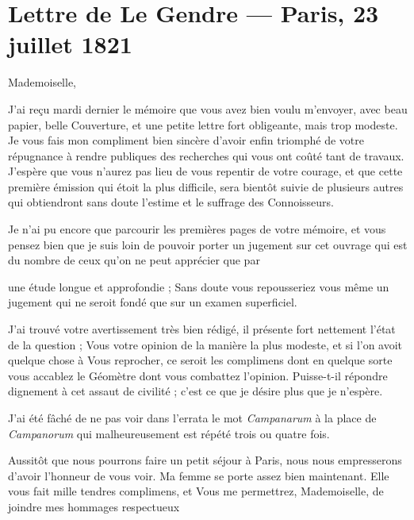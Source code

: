 \documentclass[11pt,a4paper]{article}
\begin{document}
\section{Lettre de Le Gendre — Paris, 23 juillet 1821}


Mademoiselle,

J'ai reçu mardi dernier le mémoire que vous avez bien voulu m'envoyer, avec
beau papier, belle Couverture, et une petite lettre fort obligeante, mais trop
modeste. Je vous fais mon compliment bien sincère d'avoir enfin triomphé de
votre répugnance à rendre publiques des recherches qui vous ont coûté tant de
travaux. J'espère que vous n'aurez pas lieu de vous repentir de votre courage,
et que cette première émission qui étoit la plus difficile, sera bientôt suivie
de plusieurs autres qui obtiendront sans doute l'estime et le suffrage des
Connoisseurs.

Je n'ai pu encore que parcourir les premières pages de votre mémoire, et vous
pensez bien que je suis loin de pouvoir porter un jugement sur cet ouvrage qui
est du nombre de ceux qu'on ne peut apprécier que par

une étude longue et approfondie ; \struck{\ill{}} Sans doute vous repousseriez
vous même un jugement qui ne seroit fondé que sur un examen superficiel.

J'ai trouvé votre avertissement très bien rédigé, il présente fort nettement
l'état de la question ; Vous \struck{\ill{}} votre opinion de la manière la
plus modeste, et si l'on avoit quelque chose à Vous reprocher, ce seroit les
complimens dont en quelque sorte vous accablez le Géomètre dont vous combattez
l'opinion. Puisse-t-il répondre dignement à cet assaut de civilité ; c'est ce
que je désire plus que je n'espère.

J'ai été fâché de ne pas voir dans l'errata le mot \emph{Campanarum} à la place
de \emph{Campanorum} qui malheureusement est répété trois ou quatre fois.

Aussitôt que nous pourrons faire un petit séjour à Paris, nous nous
empresserons d'avoir l'honneur de vous voir. Ma femme se porte assez bien
maintenant. Elle vous fait mille tendres complimens, et Vous me permettrez,
Mademoiselle, de joindre mes hommages respectueux
\end{document}
